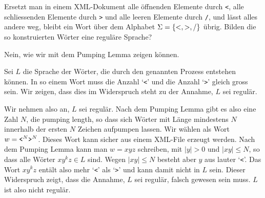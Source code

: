Ersetzt man in einem XML-Dokument alle öffnenden Elemente durch {\tt <},
alle schliessenden Elemente durch {\tt >} und alle leeren Elemente
durch {\tt /}, und lässt alles andere weg, bleibt ein Wort über
dem Alphabet $\Sigma =\{{\tt <},{\tt >},{\tt /}\}$ übrig.
Bilden die so konstruierten Wörter eine reguläre Sprache?

\begin{loesung}
Nein, wie wir mit dem Pumping Lemma zeigen können.

Sei $L$ die Sprache der Wörter, die durch den genannten Prozess
entstehen können. In so einem Wort muss die Anzahl `{\tt <}' und die
Anzahl `{\tt >}' gleich gross sein. Wir zeigen, dass dies im Widerspruch
steht zu der Annahme, $L$ sei regulär.

Wir nehmen also an, $L$ sei regulär. Nach dem Pumping Lemma gibt
es also eine Zahl $N$, die pumping length, so dass sich Wörter mit
Länge mindestens $N$ innerhalb der ersten $N$ Zeichen aufpumpen lassen.
Wir wählen als Wort $w=\text{\tt <}^N\text{\tt >}^N$. Dieses Wort
kann sicher aus einem XML-File erzeugt werden. Nach dem Pumping
Lemma kann man $w=xyz$ schreiben, mit $|y|>0$ und $|xy|\le N$, so dass
alle Wörter $xy^kz\in L$ sind. Wegen $|xy|\le N$ besteht aber
$y$ aus lauter `{\tt <}'. Das Wort $xy^kz$ entält also mehr
`{\tt <}' als `{\tt >}' und kann damit nicht in $L$ sein. Dieser
Widerspruch zeigt, dass die Annahme, $L$ sei regulär, falsch gewesen
sein muss. $L$ ist also nicht regulär.
\end{loesung}
